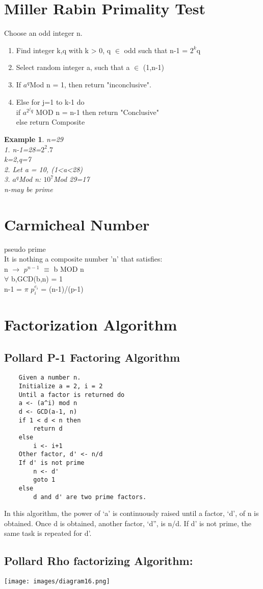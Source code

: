 \documentclass{article}
\newtheorem{ex}{Example}[section]
\begin{document}
\section{Miller Rabin Primality Test}
Choose an odd integer n.
\begin{enumerate}
    \item Find integer k,q with k > 0, q $\in$ odd such that n-1 = $2^{k}$q
    \item Select random integer a, such that a $\in$ (1,n-1)
    \item If $a^{q}$Mod n = 1, then return "inconclusive".
    \item Else for j=1 to k-1 do
    \\if $a^{{2}^{j}q}$ MOD n = n-1 then return "Conclusive"
    \\else return Composite
\end{enumerate}
\begin{ex}
n=29
\\1. n-1=28=$2^{2}.7$
\\k=2,q=7
\\2. Let a = 10, (1<a<28)
\\3. $a^{q}$Mod n: $10^{7}$Mod 29=17
\\n-may be prime
\end{ex}
\section{Carmicheal Number}
pseudo prime
\\ It is nothing a composite number 'n' that satisfies:
\\n $\rightarrow$ $p^{n-1}$ $\equiv$ b MOD n
\\ $\forall$ b,GCD(b,n) = 1
\\n-1 = $\pi$ $p^{e_i}_i$ = (n-1)/(p-1) 
\section{Factorization Algorithm}
\subsection{Pollard P-1 Factoring Algorithm}
\begin{lstlisting}
    Given a number n.
    Initialize a = 2, i = 2
    Until a factor is returned do
    a <- (a^i) mod n
    d <- GCD(a-1, n)
    if 1 < d < n then
        return d
    else
        i <- i+1
    Other factor, d' <- n/d
    If d' is not prime
        n <- d'
        goto 1
    else
        d and d' are two prime factors. 
\end{lstlisting}
In this algorithm, the power of ‘a’ is continuously raised until a factor, ‘d’, of n is obtained. Once d is obtained, another factor, ‘d”, is n/d. If d’ is not prime, the same task is repeated for d’.
\subsection{Pollard Rho factorizing Algorithm:}
\texttt{[image: images/diagram16.png]}
\end{document}

